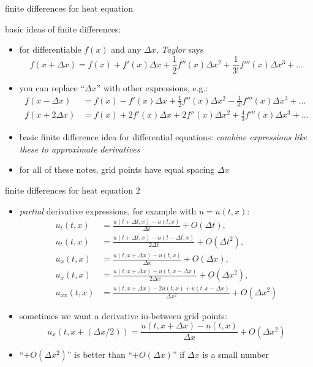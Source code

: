 \begin{frame}{finite differences for heat equation}

basic ideas of finite differences:
\begin{itemize}
\item for differentiable $f(x)$ and any $\Delta x$, \emph{Taylor} says
\small
	$$f(x+\Delta x) = f(x) + f'(x) \Delta x + \frac{1}{2} f''(x) \Delta x^2 + \frac{1}{3!} f'''(x) \Delta x^3 + \dots$$
\normalsize
\item you can replace ``$\Delta x$'' with other expressions, e.g.:
\small
\begin{align*}
f(x-\Delta x) &= f(x) - f'(x) \Delta x + \frac{1}{2} f''(x) \Delta x^2 - \frac{1}{3!} f'''(x) \Delta x^3 + \dots \\
f(x+2\Delta x) &= f(x) + 2 f'(x) \Delta x + 2 f''(x) \Delta x^2 + \frac{4}{3} f'''(x) \Delta x^3 + \dots
\end{align*}
\normalsize
\item basic finite difference idea for differential equations: \emph{combine expressions like these to approximate derivatives}
\item for all of these notes, grid points have equal spacing $\Delta x$
\end{itemize}
\end{frame}


\begin{frame}{finite differences for heat equation 2}

\begin{itemize}
\item \emph{partial} derivative expressions, for example with $u=u(t,x)$:
\small
\begin{align*}
u_t(t,x) &= \frac{u(t+\Delta t,x) - u(t,x)}{\Delta t} + O(\Delta t), \\
u_t(t,x) &= \frac{u(t+\Delta t,x) - u(t-\Delta t,x)}{2\Delta t} + O(\Delta t^2), \\
u_x(t,x) &= \frac{u(t,x+\Delta x) - u(t,x)}{\Delta x} + O(\Delta x), \\
u_x(t,x) &= \frac{u(t,x+\Delta x) - u(t,x-\Delta x)}{2\Delta x} + O(\Delta x^2), \\
u_{xx}(t,x) &= \frac{u(t,x+\Delta x) - 2 u(t,x) + u(t,x-\Delta x)}{\Delta x^2} + O(\Delta x^2)
\end{align*}
\normalsize
\item sometimes we want a derivative in-between grid points:
\small
	$$u_x(t,x+(\Delta x/2)) = \frac{u(t,x+\Delta x) - u(t,x)}{\Delta x} + O(\Delta x^2)$$
\normalsize
\item ``$+O(\Delta x^2)$'' is better than ``$+O(\Delta x)$'' if $\Delta x$ is a small number
\end{itemize}
\end{frame}


